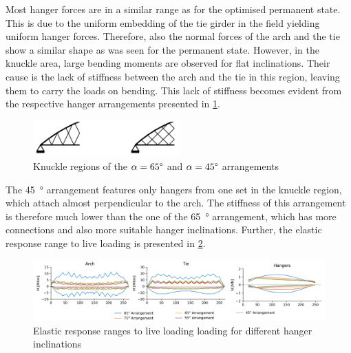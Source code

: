 Most hanger forces are in a similar range as for the optimised permanent state. This is due to the uniform embedding of the tie girder in the field yielding uniform hanger forces. Therefore, also the normal forces of the arch and the tie show a similar shape as was seen for the permanent state. However, in the knuckle area, large bending moments are observed for flat inclinations. Their cause is the lack of stiffness between the arch and the tie in this region, leaving them to carry the loads on bending. This lack of stiffness becomes evident from the respective hanger arrangements presented in \cref{fig:arrangements}.

\begin{figure}[H]
\centering
\includegraphics[width=0.5\textwidth]{overleaf/Pictures/snap_knuckle.PNG}
\caption{Knuckle regions of the $\alpha=65\degree$ and  $\alpha=45\degree$ arrangements}
\label{fig:arrangements}
\end{figure}

The \SI{45}{\degree} arrangement features only hangers from one set in the knuckle region, which attach almost perpendicular to the arch. The stiffness of this arrangement is therefore much lower than the one of the \SI{65}{\degree} arrangement, which has more connections and also more suitable hanger inclinations. Further, the elastic response range to live loading is presented in \cref{fig:inclination_live}.

\begin{figure}[H]
    \centering
    \includegraphics[trim={1cm 0 1cm 0},clip, width=\textwidth]{calculations/parallel arrangement comparison/live loading_plot.png}
    \caption{Elastic response ranges to live loading loading for different hanger inclinations}
    \label{fig:inclination_live}
\end{figure}

